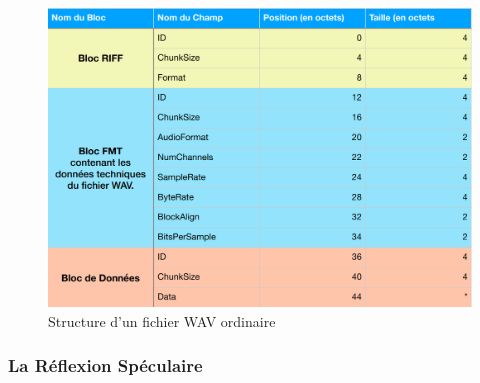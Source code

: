 \documentclass[11pt]{article}
\begin{document}
\begin{figure}[t]
    \begin{center}
        \includegraphics[scale=0.2]{Screenshot from 2022-05-22 22-49-39.png}
        \caption{Structure d'un fichier WAV ordinaire}
    \end{center}
\end{figure}

\newpage

\subsubsection{La Réflexion Spéculaire}
\end{document}
